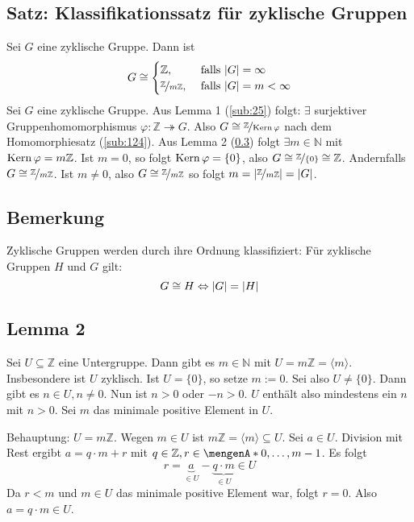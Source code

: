 \subsection{Satz: Klassifikationssatz für zyklische Gruppen} %
\label{sub:26}
Sei $G$ eine zyklische Gruppe. Dann ist 
\[
	G \cong \begin{cases}
		\mathds{Z}, &\text{ falls } \abs*{G}= \infty \\
		\nicefrac{\mathds{Z}}{m \mathds{Z}}, &\text{ falls } \abs*{G}=m < \infty
	\end{cases}
\]
Sei $G$ eine zyklische Gruppe. Aus Lemma 1 (\ref{sub:25}) folgt: $\exists$ surjektiver Gruppenhomomorphismus $\varphi : \mathds{Z} \twoheadrightarrow G$. Also $G \cong \nicefrac{\mathds{Z}}{\Kern \varphi}$ nach dem Homomorphiesatz (\ref{sub:124}). Aus Lemma 2 (\ref{sub:28}) folgt $\exists m \in \mathds{N}$ mit $\Kern \varphi = m \mathds{Z}$. Ist $m=0$, so folgt
$\Kern \varphi  =\{0\}$, also $G \cong \nicefrac{\mathds{Z}}{\{0\}} \cong \mathds{Z}$. Andernfalls $G \cong \nicefrac{\mathds{Z}}{m \mathds{Z}}$. Ist $m\not= 0$, also 
$ G \cong \nicefrac{\mathds{Z}}{m \mathds{Z}}$ so folgt $m= \abs*{\nicefrac{\mathds{Z}}{m \mathds{Z}}} = \abs*{G}$. \bewende

\subsection[Bemerkung: Vergleich von zyklischen Gruppen über die Ordnung]{Bemerkung} %
\label{sub:27}
Zyklische Gruppen werden durch ihre Ordnung klassifiziert: Für zyklische Gruppen $H$ und $G$ gilt: 
\[
	G \cong H \Leftrightarrow \abs*{G}= \abs*{H}  
\]

\subsection[Lemma 2: Jede Untergruppe von $\mathds{Z}$ ist zyklisch]{Lemma 2} %
\label{sub:28}
Sei $U \subseteq  \mathds{Z}$ eine Untergruppe. Dann gibt es $m \in \mathds{N}$ mit $U = m \mathds{Z} = \langle m\rangle$. Insbesondere ist $U$ zyklisch.
Ist $U= \{0\}$, so setze $m := 0$. Sei also $U \not= \{0\}$. Dann gibt es $n \in U, n \not= 0$. Nun ist $n>0$ oder $-n>0$. $U$ enthält also mindestens ein $n$ mit $n>0$. 
Sei $m$ das minimale positive Element in $U$. 

Behauptung: $U= m \mathds{Z}$. Wegen $m \in U$ ist $m \mathds{Z}= \langle m\rangle \subseteq U$. Sei $a \in U$. Division mit Rest ergibt $a= q \cdot m + r$ mit 
$q \in \mathds{Z}, r \in \set{0, \ldots , m-1} $. Es folgt 
\[
	r= \underbrace{a}_{\in U}- \underbrace{q \cdot m}_{\in U} \in U
\]
Da $r < m$ und $m \in U$ das minimale positive Element war, folgt $r=0$. Also $a= q \cdot m \in U$. \bewende


